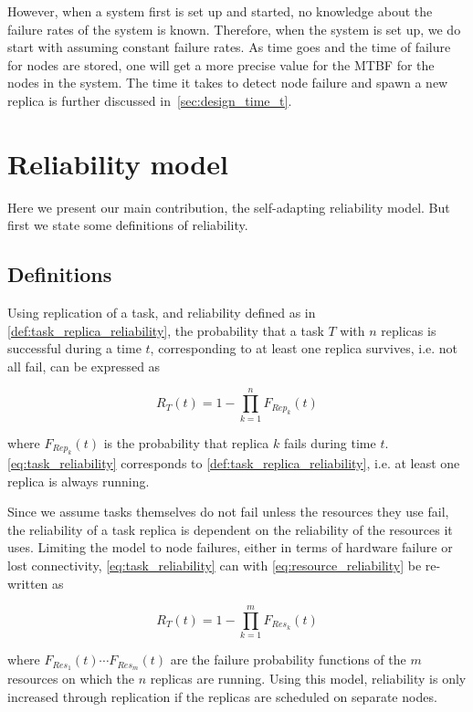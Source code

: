 \documentclass{cslthse-msc}
\begin{document}
However, when a system first is set up and started, no knowledge about the failure rates of the system is known. Therefore, when the system is set up, we do start with assuming constant failure rates. As time goes and the time of failure for nodes are stored, one will get a more precise value for the MTBF for the nodes in the system. The time it takes to detect node failure and spawn a new replica is further discussed in~\autoref{sec:design_time_t}.

\section{Reliability model} \label{sec:design_reliability_model}
Here we present our main contribution, the self-adapting reliability model. But first we state some definitions of reliability.

\subsection{Definitions} \label{subsec:design_definitions}
Using replication of a task, and reliability defined as in \autoref{def:task_replica_reliability}, the probability that a task $T$ with $n$ replicas is successful during a time $t$, corresponding to at least one replica survives, i.e. not all fail, can be expressed as 

\begin{equation} \label{eq:task_reliability}
R_{T}(t) =  1 - \prod\limits_{k=1}^n F_{Rep_k}(t)
\end{equation}

where $F_{Rep_k}(t)$ is the probability that replica $k$ fails during time $t$. \autoref{eq:task_reliability} corresponds to \autoref{def:task_replica_reliability}, i.e. at least one replica is always running.

Since we assume tasks themselves do not fail unless the resources they use fail, the reliability of a task replica is dependent on the reliability of the resources it uses. Limiting the model to node failures, either in terms of hardware failure or lost connectivity, \autoref{eq:task_reliability} can with \autoref{eq:resource_reliability} be re-written as

\begin{equation} \label{eq:task_reliability_2}
R_{T}(t) = 1 - \prod\limits_{k=1}^m  F_{Res_k}(t)
\end{equation}

where $F_{Res_1}(t) \cdots F_{Res_m}(t)$ are the failure probability functions of the $m$ resources on which the $n$ replicas are running. Using this model, reliability is only increased through replication if the replicas are scheduled on separate nodes.
\end{document}
